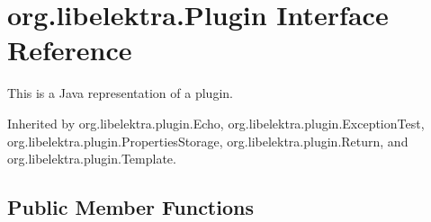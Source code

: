 \hypertarget{interfaceorg_1_1libelektra_1_1Plugin}{}\section{org.\+libelektra.\+Plugin Interface Reference}
\label{interfaceorg_1_1libelektra_1_1Plugin}


This is a Java representation of a plugin.  




Inherited by org.\+libelektra.\+plugin.\+Echo, org.\+libelektra.\+plugin.\+Exception\+Test, org.\+libelektra.\+plugin.\+Properties\+Storage, org.\+libelektra.\+plugin.\+Return, and org.\+libelektra.\+plugin.\+Template.

\subsection*{Public Member Functions}
